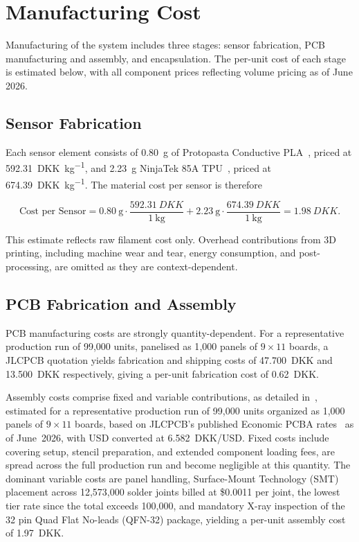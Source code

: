 \section{Manufacturing Cost} \label{sec:manufacturing_cost}
 
Manufacturing of the system includes three stages: sensor fabrication, PCB manufacturing and assembly, and encapsulation. The per-unit cost of each stage is estimated below, with all component prices reflecting volume pricing as of June 2026.
 
\subsection{Sensor Fabrication}
 
Each sensor element consists of \SI{0.80}{\gram} of Protopasta Conductive PLA~\cite{protopasta_conductive_pla}, priced at \SI{592.31}{DKK\per\kilo\gram}, and \SI{2.23}{\gram} NinjaTek 85A TPU~\cite{ninjatek_ninjaflex_2026}, priced at \SI{674.39}{DKK\per\kilo\gram}. The material cost per sensor is therefore
 
\begin{equation}
    \text{Cost per Sensor} = \SI{0.80}{\gram} \cdot \frac{\SI{592.31}{DKK}}{\SI{1}{\kilo\gram}} + \SI{2.23}{\gram} \cdot \frac{\SI{674.39}{DKK}}{\SI{1}{\kilo\gram}} = \SI{1.98}{DKK}.
\end{equation}
 
\noindent This estimate reflects raw filament cost only. Overhead contributions from 3D printing, including machine wear and tear, energy consumption, and post-processing, are omitted as they are context-dependent.
 
\subsection{PCB Fabrication and Assembly}
 
PCB manufacturing costs are strongly quantity-dependent. For a representative production run of 99{,}000 units, panelised as 1{,}000 panels of $9 \times 11$ boards, a JLCPCB quotation yields fabrication and shipping costs of \SI{47,700}{DKK} and \SI{13,500}{DKK} respectively, giving a per-unit fabrication cost of \SI{0.62}{DKK}.
 
Assembly costs comprise fixed and variable contributions, as detailed in~, estimated for a representative production run of 99{,}000 units organized as 1{,}000 panels of $9 \times 11$ boards, based on JLCPCB's published Economic PCBA rates~\cite{jlcpcb_pcba_price_2025} as of June~2026, with USD converted at 6.582~DKK/USD. Fixed costs include covering setup, stencil preparation, and extended component loading fees, are spread across the full production run and become negligible at this quantity. The dominant variable costs are panel handling, Surface-Mount Technology (SMT) placement across 12{,}573{,}000 solder joints billed at \$0.0011 per joint, the lowest tier rate since the total exceeds 100{,}000, and mandatory X-ray inspection of the 32 pin Quad Flat No-leads (QFN-32) package, yielding a per-unit assembly cost of \SI{1.97}{DKK}.

